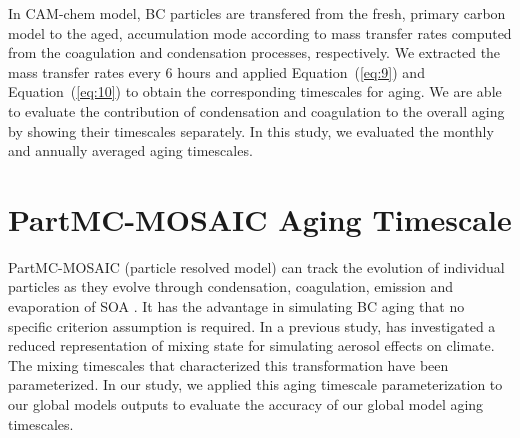 \documentclass[12pt, fullpage]{uiucthesis2009}
\begin{document}
	In CAM-chem model, BC particles are transfered from the fresh, primary carbon model to the aged, accumulation mode according to mass transfer rates computed from the coagulation and condensation processes, respectively. We extracted the mass transfer rates every 6 hours and applied Equation~(\ref{eq:9}) and Equation~(\ref{eq:10}) to obtain the corresponding timescales for aging. We are able to evaluate the contribution of condensation and coagulation to the overall aging by showing their  timescales separately. In this study, we evaluated the monthly and annually averaged aging timescales. 
	
	\section{PartMC-MOSAIC Aging Timescale}\label{sec_4}
	PartMC-MOSAIC (particle resolved model) can track the evolution of individual particles as they evolve through condensation, coagulation, emission and evaporation of SOA \citep{riemer2009simulating}. It has the advantage in simulating BC aging that no specific criterion assumption is required. In a previous study, \citet{Fierce2016} has investigated a reduced representation of mixing state for simulating aerosol effects on climate. The mixing timescales that characterized this transformation have been parameterized. In our study, we applied this aging timescale parameterization to our global models outputs to evaluate the accuracy of our global model aging timescales.
	
\end{document}
